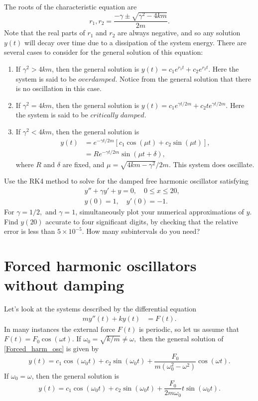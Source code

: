 The roots of the characteristic equation are \[r_1,r_2 = \frac{-\gamma \pm \sqrt{\gamma^2 -4km}}{2m} .\]
Note that the real parts of $r_1$ and $r_2$ are always negative, and so any solution $y(t)$ will decay over time due to a dissipation of the system energy. 
There are several cases to consider for the general solution of this equation:
\begin{enumerate}
\item If $\gamma^2 > 4km$, then the general solution is $y(t) = c_1 e^{r_1t} + c_2e^{r_2t}$. Here the system is said to be $\textit{overdamped}$. 
Notice from the general solution that there is no oscillation in this case.
\item If $\gamma^2 = 4km$, then the general solution is $y(t) = c_1 e^{\gamma t/2m} + c_2 te^{\gamma t/2m}$. Here the system is said to be $\textit{critically damped}$.
\item If $\gamma^2 < 4km$, then the general solution is
\begin{align*}
y(t) &= e^{-\gamma t/2m} \left[c_1\cos(\mu t) + c_2 \sin (\mu t)\right],\\
&= R e^{-\gamma t/2m}  \sin (\mu t + \delta),
\end{align*}
where $R$ and $\delta$ are fixed, and $\mu = \sqrt{4km-\gamma^2}/2m.$ This system does oscillate.
\end{enumerate}

\begin{problem}
Use the RK4 method to solve for the damped free harmonic oscillator satisfying 
\begin{align*}
&{}y'' +\gamma y'+ y = 0, \quad 0 \leq x \leq 20,\\
&{}y(0) = 1, \quad
y'(0) = -1.
\end{align*}
For $\gamma = 1/2,$ and $\gamma = 1$, simultaneously plot your numerical approximations of $y$.  
Find $y(20)$ accurate to four significant digits, by checking that the relative error is less than $5\times 10^{-5}$.  
How many subintervals do you need?
\end{problem}

\section*{Forced harmonic oscillators without damping}
Let's look at the systems described by the differential equation
\begin{align}
my''(t)  + ky(t) &= F(t). \label{Forced_harm_osc}
\end{align}
In many instances the external force $F(t)$ is periodic, so let us assume that $F(t) = F_0 \cos(\omega t)$. 
If $\omega_0 = \sqrt{k/m} \not = \omega,$ then the  general solution of \ref{Forced_harm_osc} is given by
\[y(t) = c_1 \cos (\omega_0 t) + c_2\sin (\omega_0 t) + \frac{F_0}{m(\omega_0^2 - \omega^2)} \cos (\omega t).\]
If $\omega_0 = \omega$, then the general solution is
\[y(t) = c_1 \cos (\omega_0 t) + c_2\sin (\omega_0 t) + \frac{F_0}{2m\omega_0} t \sin (\omega_0 t).\]

